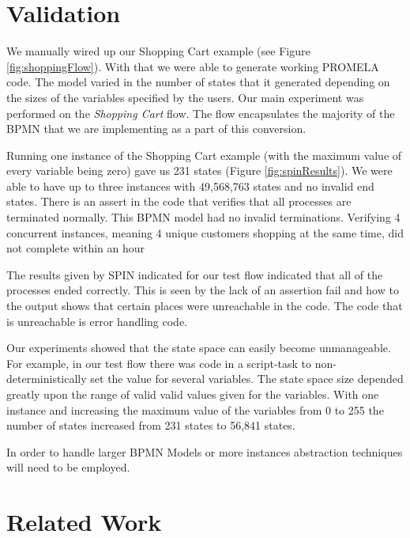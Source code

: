 \documentclass[11pt,twocolumn]{article}
\begin{document}


\section{Validation}

We manually wired up our Shopping Cart example (see Figure \ref{fig:shoppingFlow}). With that we were able to generate working PROMELA code. The model varied in the number of states that it generated depending on the sizes of the variables specified by the users. 
Our main experiment was performed on the \emph{Shopping Cart} flow. The flow encapsulates the majority of the BPMN that we are implementing as a part of this conversion.

Running one instance of the Shopping Cart example (with the maximum value of every variable being zero) gave us 231 states (Figure \ref{fig:spinResults}). We were able to have up to three instances with 49,568,763 states and no invalid end states. There is an assert in the code that verifies that all processes are terminated normally. This BPMN model had no invalid terminations. Verifying 4 concurrent instances, meaning 4 unique customers shopping at the same time, did not complete within an hour

The results given by SPIN indicated for our test flow indicated that all of the processes ended correctly. This is seen by the lack of an assertion fail and how to the output shows that certain places were unreachable in the code. The code that is unreachable is error handling code.

Our experiments showed that the state space can easily become unmanageable. For example, in our test flow there was code in a script-task to non-deterministically set the value for several variables. The state space size depended greatly upon the range of valid valid values given for the variables. With one instance and increasing the maximum value of the variables from 0 to 255 the number of states increased from 231 states to 56,841 states. 

In order to handle larger BPMN Models or more instances abstraction techniques will need to be employed.

\section{Related Work}
\end{document}
